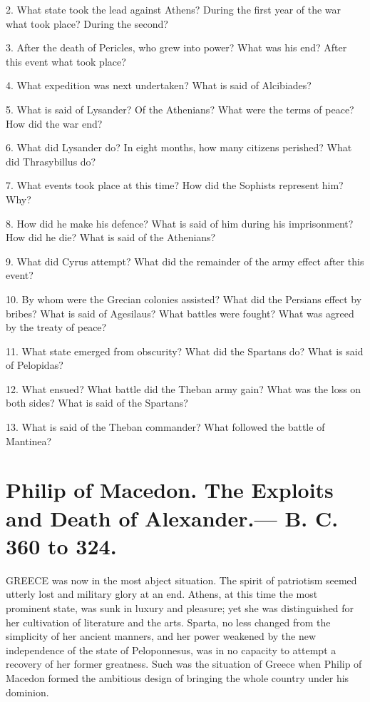 \documentclass[openany,a4paper]{memoir}
\begin{document}
2. What state took the lead against Athens? During the first year 
of the war what took place? During the second?

3. After the death 
of Pericles, who grew into power? What was his end? After this 
event what took place?

4. What expedition was next undertaken? 
What is said of Alcibiades?

5. What is said of Lysander? 
Of the Athenians? What were the terms of peace? How did the 
war end?

6. What did Lysander do? In eight months, how many 
citizens perished? What did Thrasybillus do?

7. What events took 
place at this time? How did the Sophists represent him? Why?

8. How did he make his defence? What is said of him during his imprisonment? 
How did he die? What is said of the Athenians?

9. What did Cyrus attempt? What did the remainder of the army effect after this 
event? 

10. By whom were the Grecian colonies assisted? What did 
the Persians effect by bribes? What is said of Agesilaus? What battles 
were fought? What was agreed by the treaty of peace? 

11. What 
state emerged from obscurity? What did the Spartans do? 
What is said of Pelopidas? 

12. What ensued? What battle did the 
Theban army gain? What was the loss on both sides? What is said 
of the Spartans? 

13. What is said of the Theban commander? What 
followed the battle of Mantinea? 


\chapter{Philip of Macedon. The Exploits and Death of 
Alexander.— B. C. 360 to 324.}

GREECE was now in the most abject situation. The 
spirit of patriotism seemed utterly lost and military 
glory at an end. Athens, at this time the most prominent 
state, was sunk in luxury and pleasure; yet she was distinguished for her cultivation of literature and the arts. 
Sparta, no less changed from the simplicity of her ancient 
manners, and her power weakened by the new independence 
of the state of Peloponnesus, was in no capacity to attempt 
a recovery of her former greatness. Such was the situation 
of Greece when Philip of Macedon formed the ambitious 
design of bringing the whole country under his dominion. 
\end{document}
